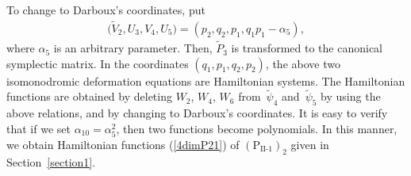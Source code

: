 \documentclass[10pt,a4paper]{amsart}
\numberwithin{equation}{section}
\begin{document}
To change to Darboux's coordinates, put
\begin{gather*}
\big(\widetilde{V}_2, U_3, V_4, U_5\big) = (p_2, q_2, p_1, q_1p_1 - \alpha _5),
\end{gather*}
where $\alpha _5$ is an arbitrary parameter. Then, $\widetilde{P}_3$ is transformed to the canonical symplectic mat\-rix. In the coordinates $(q_1, p_1, q_2, p_2)$, the above two isomonodromic deformation equations are Hamiltonian systems. The Hamiltonian functions are obtained by deleting $W_2$, $W_4$, $W_6$ from~$\widetilde{\psi}_4$ and~$\widetilde{\psi}_5$ by using the above relations, and by changing to Darboux's coordinates. It is easy to verify that if we set $\alpha _{10}=\alpha _5^2$, then two functions become polynomials. In this manner, we obtain Hamiltonian functions (\ref{4dimP21}) of $(\text{P}_\text{II-1})_2$ given in Section~\ref{section1}.
\end{document}
